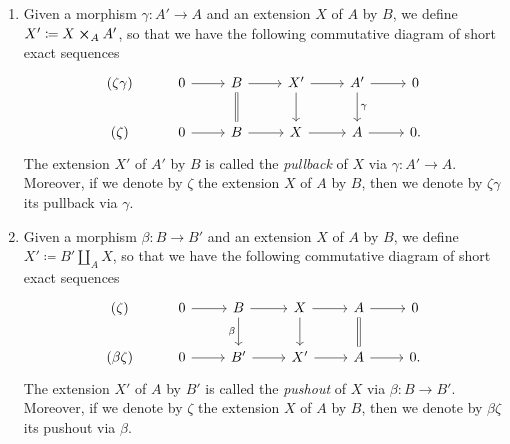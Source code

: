 \begin{defn}\leavevmode\vspace{-\baselineskip}
\begin{enumerate}
	\item Given a morphism $\gamma\colon A' \to A$ and an extension $X$
		of $A$ by $B$, we define $X' \coloneqq X \cross_A A'$,
		so that we have the following commutative diagram
		of short exact sequences
		\begin{equation*}
		\begin{tikzcd}
			(\zeta\gamma) &
			0 \arrow[r, "", rightarrow] &
			B \arrow[r, "", rightarrow] 
			\arrow[d, "", equals] &
			X' \arrow[r, "", rightarrow] 
			\arrow[d, "", rightarrow] &
			A' \arrow[r, "", rightarrow] 
			\arrow[d, "\gamma", rightarrow] &
			0\\
			(\zeta) &
			0 \arrow[r, "", rightarrow] &
			B \arrow[r, "", rightarrow] &
			X \arrow[r, "", rightarrow] &
			A \arrow[r, "", rightarrow] &
			0
		.\end{tikzcd}
		\end{equation*}
		The extension $X'$ of $A'$ by $B$
		is called the {\em pullback} of $X$ via $\gamma\colon A' \to A$.
		Moreover, if we denote by $\zeta$ the extension
		$X$ of $A$ by $B$, then we denote by $\zeta\gamma$
		its pullback via $\gamma$.

	\item Given a morphism $\beta\colon B \to B'$ and an extension $X$
		of $A$ by $B$, we define $X' \coloneqq B' \amalg_A X$,
		so that we have the following commutative diagram
		of short exact sequences
		\begin{equation*}
		\begin{tikzcd}
			(\zeta) &
			0 \arrow[r, "", rightarrow] &
			B \arrow[r, "", rightarrow] 
			\arrow[d, "\beta"', rightarrow] &
			X \arrow[r, "", rightarrow] 
			\arrow[d, "", rightarrow] &
			A \arrow[r, "", rightarrow] 
			\arrow[d, "", equals] &
			0\\
			(\beta\zeta) &
			0 \arrow[r, "", rightarrow] &
			B' \arrow[r, "", rightarrow] &
			X' \arrow[r, "", rightarrow] &
			A \arrow[r, "", rightarrow] &
			0
		.\end{tikzcd}
		\end{equation*}
		The extension $X'$ of $A$ by $B'$
		is called the {\em pushout} of $X$ via $\beta\colon B \to B'$.
		Moreover, if we denote by $\zeta$ the extension
		$X$ of $A$ by $B$, then we denote by $\beta\zeta$
		its pushout via $\beta$.
\end{enumerate}
\end{defn}


